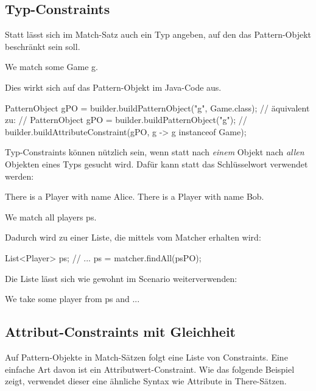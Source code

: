 \subsection{Typ-Constraints}

Statt  lässt sich im Match-Satz auch ein Typ angeben, auf den das Pattern-Objekt beschränkt sein soll.

\begin{mdcodeblock}
    We match some Game g.
\end{mdcodeblock}

Dies wirkt sich auf das Pattern-Objekt im Java-Code aus.

\begin{jcodeblock}
    PatternObject gPO = builder.buildPatternObject("g", Game.class);
    // äquivalent zu:
    // PatternObject gPO = builder.buildPatternObject("g");
    // builder.buildAttributeConstraint(gPO, g -> g instanceof Game);
\end{jcodeblock}

Typ-Constraints können nützlich sein, wenn statt nach \emph{einem} Objekt nach \emph{allen} Objekten eines Typs gesucht wird.
Dafür kann statt  das Schlüsselwort  verwendet werden:

\begin{mdcodeblock}
    There is a Player with name Alice.
    There is a Player with name Bob.

    We match all players ps.
\end{mdcodeblock}

Dadurch wird  zu einer Liste, die mittels  vom Matcher erhalten wird:

\begin{jcodeblock}
    List<Player> ps;
    {
        // ...
        ps = matcher.findAll(psPO);
    }
\end{jcodeblock}

Die Liste lässt sich wie gewohnt im Scenario weiterverwenden:

\begin{mdcodeblock}
    We take some player from ps and ...
\end{mdcodeblock}

\subsection{Attribut-Constraints mit Gleichheit}

Auf Pattern-Objekte in Match-Sätzen folgt eine Liste von Constraints.
Eine einfache Art davon ist ein Attributwert-Constraint.
Wie das folgende Beispiel zeigt, verwendet dieser eine ähnliche Syntax wie Attribute in There-Sätzen.

